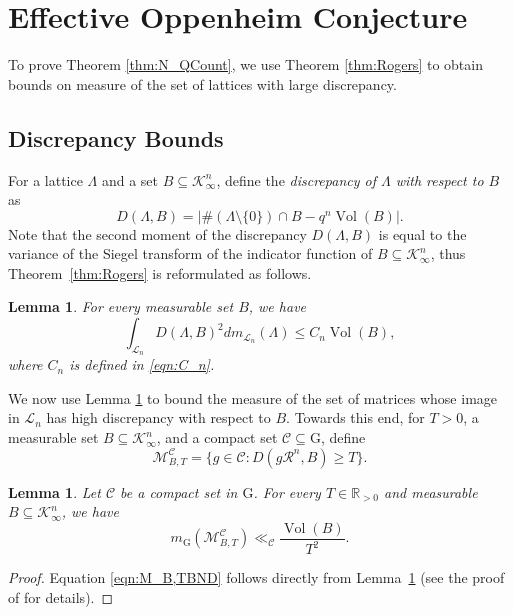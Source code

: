 \documentclass[11pt,a4paper,reqno]{amsart}
\newtheorem{lemma}[theorem]{Lemma}
\theoremstyle{definition}
\theoremstyle{remark}
\numberwithin{equation}{section}
\begin{document}
\section{Effective Oppenheim Conjecture}
\label{sec:Oppenheim}
To prove Theorem \ref{thm:N_QCount}, we use Theorem \ref{thm:Rogers} to obtain bounds on measure of the set of lattices with large discrepancy. 
\subsection{Discrepancy Bounds}
For a lattice $\Lambda$ and a set $B\subseteq \mathcal{K}_{\infty}^n$, define the \emph{discrepancy of $\Lambda$ with respect to $B$} as 
$$D(\Lambda,B)=\left|\#(\Lambda\setminus\{0\})\cap B-q^n\operatorname{Vol}(B)\right|.$$
Note that the second moment of the discrepancy $D(\Lambda, B)$ is equal to the variance of the Siegel transform of the indicator function of $B\subseteq \mathcal{K}_{\infty}^n$, thus Theorem~\ref{thm:Rogers} is reformulated as follows.
\begin{lemma}
\label{lem:DiscInt}
For every measurable set $B$, we have 
     $$\int_{\mathcal{L}_n}D(\Lambda,B)^2dm_{\mathcal{L}_n}(\Lambda)\le C_{n}\operatorname{Vol}(B),$$
where $C_n$ is defined in \eqref{eqn:C_n}.
\end{lemma}
We now use Lemma \ref{lem:DiscInt} to bound the measure of the set of matrices whose image in $\mathcal{L}_n$ has high discrepancy with respect to $B$. Towards this end, for $T>0$, a measurable set $B\subseteq \mathcal{K}_{\infty}^n$, and a compact set $\mathcal{C}\subseteq \mathrm{G}$, define
$$\mathcal{M}_{B,T}^{\mathcal{C}}=\{g\in \mathcal{C}:D(g\mathcal{R}^{n},B)\geq T\}.$$
\begin{lemma}
\label{lem:measLargDiscrep}
Let $\mathcal C$ be a compact set in $\mathrm{G}$.
    For every $T\in \mathbb{R}_{>0}$ and measurable $B\subseteq \mathcal{K}_{\infty}^n$, we have
    \begin{equation}
    \label{eqn:M_B,TBND}
        m_{\mathrm{G}}(\mathcal{M}_{B,T}^{\mathcal{C}})\ll_{\mathcal{C}}\frac{\operatorname{Vol}(B)}{T^2}.
    \end{equation}
\end{lemma}
\begin{proof}
    Equation \eqref{eqn:M_B,TBND} follows directly from Lemma~\ref{lem:DiscInt} (see the proof of \cite[Lemma 2.2]{KY} for details).
\end{proof}
\end{document}
